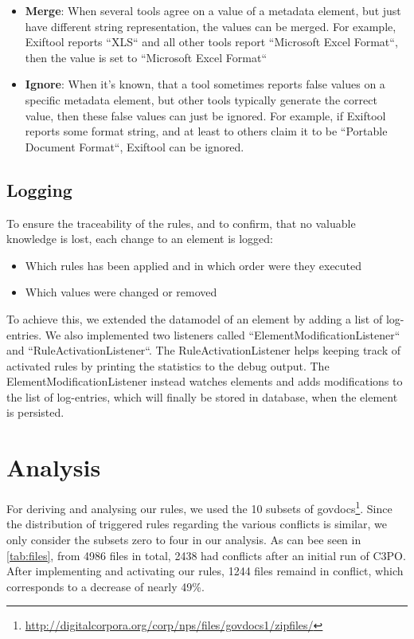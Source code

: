 \documentclass[a4paper,12pt]{article}
\begin{document}
\begin{itemize}
\item \textbf{Merge}: When several tools agree on a value of a metadata element, but just have different string representation, the values can be merged. For example, Exiftool reports ``XLS`` and all other tools report ``Microsoft Excel Format``, then the value is set to ``Microsoft Excel Format``
\item \textbf{Ignore}: When it's known, that a tool sometimes reports false values on a specific metadata element, but other tools typically generate the correct value, then these false values can just be ignored. For example, if Exiftool reports some format string, and at least to others claim it to be ``Portable Document Format``, Exiftool can be ignored.

\end{itemize}


\subsection{Logging}

To ensure the traceability of the rules, and to confirm, that no valuable knowledge is lost, each change to an element is logged:
\begin{itemize}
\item Which rules has been applied and in which order were they executed
\item Which values were changed or removed
\end{itemize}

To achieve this, we extended the datamodel of an element by adding a list of log-entries. We also implemented two listeners called ``ElementModificationListener`` and ``RuleActivationListener``. The RuleActivationListener helps keeping track of activated rules by printing the statistics to the debug output.
The ElementModificationListener instead watches elements and adds modifications to the list of log-entries, which will finally be stored in database, when the element is persisted.


\section{Analysis}

For deriving and analysing our rules, we used the 10 subsets of govdocs\footnote{\url{http://digitalcorpora.org/corp/nps/files/govdocs1/zipfiles/}}.
Since the distribution of triggered rules regarding the various conflicts is similar, we only consider the subsets zero to four in our analysis.
As can bee seen in \ref{tab:files}, from 4986 files in total, 2438 had conflicts after an initial run of C3PO. After implementing and activating our rules, 1244 files remaind in conflict, which corresponds to a decrease of nearly 49\%.
\end{document}
